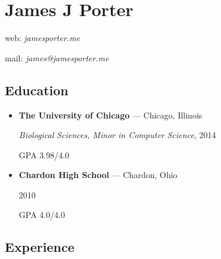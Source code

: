 \documentclass[]{article}
\date{}
\begin{document}
\section{James J Porter}\label{james-j-porter}

web: \emph{jamesporter.me}

mail: \emph{james@jamesporter.me}

\subsection{Education}\label{education}

\begin{itemize}
\item
  \textbf{The University of Chicago} --- Chicago, Illinois

  \emph{Biological Sciences, Minor in Computer Science}, 2014

  GPA 3.98/4.0
\item
  \textbf{Chardon High School} --- Chardon, Ohio

  2010

  GPA 4.0/4.0
\end{itemize}

\subsection{Experience}\label{experience}
\end{document}
